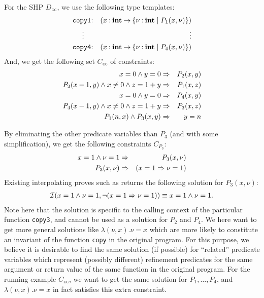 For the SHP \(D_{\texttt{cc}}\), we use the following type templates:
\begin{eqnarray*}
\texttt{copy1}&\mathbin{:}&(x\mathbin{:}{\mathbf{int}}\mathbin{\rightarrow}{\{{\nu\mathbin{:}\mathbf{int} \mid P_1(x,\nu)}\}}) \\
\vdots\quad &&\qquad\qquad \vdots \\
\texttt{copy4}&\mathbin{:}&(x\mathbin{:}{\mathbf{int}}\mathbin{\rightarrow}{\{{\nu\mathbin{:}\mathbf{int} \mid P_4(x,\nu)}\}})
\end{eqnarray*}
And, we get the following set \(C_{\texttt{cc}}\) of constraints:
\begin{eqnarray*}
x=0 \land y=0 &\Rightarrow& P_2(x,y) \\
P_2(x-1,y) \land x\neq0 \land z=1+y &\Rightarrow& P_1(x,z) \\
x=0 \land y=0 &\Rightarrow& P_4(x,y) \\
P_4(x-1,y) \land x\neq0 \land z=1+y &\Rightarrow& P_3(x,z) \\
P_1(n,x) \land P_3(x,y) &\Rightarrow& y=n
\end{eqnarray*}

By eliminating the other predicate variables than \(P_3\) (and with some
simplification), we get the following constraints \(C_{P_3}\):
\begin{eqnarray*}
x=1 \land \nu=1 &\Rightarrow& P_3(x,\nu) \\
P_3(x,\nu) &\Rightarrow& (x=1 \Rightarrow \nu=1)
\end{eqnarray*}
Existing interpolating proves such as \cite{Beyer2008} returns the
following solution for \(P_3(x,\nu)\):
\begin{eqnarray*}
\mathcal{I}(x=1 \land \nu=1,\neg (x=1 \Rightarrow \nu=1))
\equiv x=1 \land \nu=1.
\end{eqnarray*}
Note here that the solution is specific to the calling context of the
particular function \texttt{copy3}, and cannot be used as a solution for
\(P_2\) and \(P_4\).  We here want to get more general solutions like
\(\lambda (\nu,x).\nu=x\) which are more likely to constitute an
invariant of the function \texttt{copy} in the original program.  For
this purpose, we believe it is desirable to find the same solution (if
possible) for ``related'' predicate variables which represent (possibly
different) refinement predicates for the same argument or return value
of the same function in the original program.  For the running example
\(C_{\texttt{cc}}\), we want to get the same solution for
\(P_1,\dots,P_4\), and \(\lambda (\nu,x).\nu=x\) in fact satisfies this
extra constraint.

